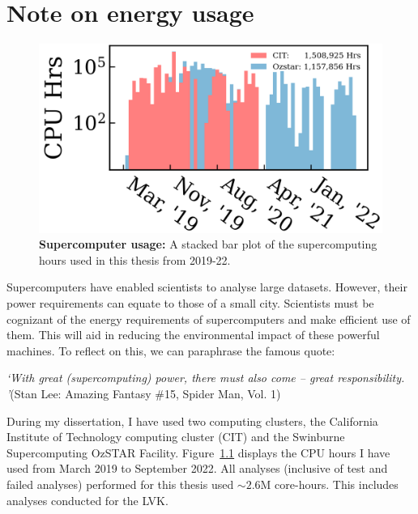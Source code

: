 \chapter{Note on energy usage}\label{apdx.energy}


\begin{figure}
\begin{center}
\centerline{\includegraphics[width=0.75\linewidth]{figures/cpuhrs_timeseries.png}}
  \caption{\textbf{Supercomputer usage:} A stacked bar plot of the supercomputing hours used in this thesis from 2019-22.}\label{fig:computing}
\end{center}
\end{figure}

Supercomputers have enabled scientists to analyse large datasets. However, their power requirements can equate to those of a small city. Scientists must be cognizant of the energy requirements of supercomputers and make efficient use of them.  This will aid in reducing the environmental impact of these powerful machines. To reflect on this, we can paraphrase the famous quote: 

\hspace*{2em}\emph{`With great (supercomputing) power, there must also come --  great responsibility. '}\hspace*{2em}\hfill(Stan Lee:  Amazing Fantasy \#15, Spider Man,  Vol. 1)


During my dissertation, I have used two computing clusters, the California Institute of Technology computing cluster (CIT) and the Swinburne Supercomputing OzSTAR Facility. Figure~\ref{fig:computing} displays the CPU hours I have used from March 2019 to September 2022. All analyses (inclusive of test and failed analyses) performed for this thesis used ${\sim2.6\mathrm{M}}$ core-hours. This includes analyses conducted for the LVK.

